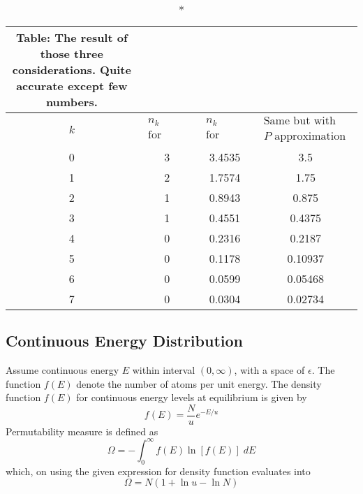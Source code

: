 \documentclass[../../../Main.tex]{subfiles}
\begin{document}
\begin{longtable}{c||c||c||c}
    \caption*{Table: The result of those three considerations. Quite accurate except few numbers.}\\
    \hline\hline
    $k$&$\begin{array}{c}
        n_k\\
        \text{for small system}
    \end{array}$ &$\begin{array}{c}
        n_k\\
        \text{for large system}
    \end{array}$ &$\begin{array}{c}
        \text{Same but with large}\\
        P\text{ approximation}
    \end{array}$\\ 
    \hline\hline
    0 &3&3.4535&3.5 \\
    1 &2&1.7574&1.75 \\
    2 &1&0.8943&0.875 \\
    3 &1&0.4551&0.4375 \\
    4 &0&0.2316&0.2187 \\
    5 &0&0.1178&0.10937 \\
    6 &0&0.0599&0.05468 \\
    7 &0&0.0304&0.02734 \\
\end{longtable}


\subsection*{Continuous Energy Distribution}
Assume continuous energy $E$ within interval $(0,\infty)$, with a space of $\epsilon$. The function $f(E)$ denote the number of atoms per unit energy. The density function $f(E) $ for continuous energy levels at equilibrium is given by
\begin{equation*}
    f(E)=\frac{N}{u}e^{-E/u}
\end{equation*}
Permutability measure is defined as 
\begin{equation*}
    \Omega=-\int_{0}^{\infty}f(E)\ln\left[f(E)\right]\;dE
\end{equation*}
which, on using the given expression for density function evaluates into 
\begin{equation*}
    \Omega=N(1+\ln u-\ln N)
\end{equation*}
\end{document}
